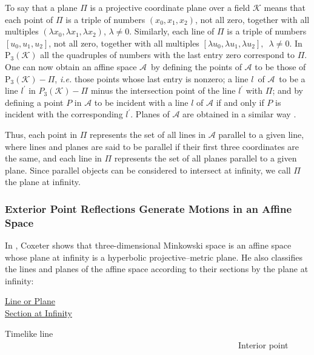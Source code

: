 \documentclass[a4paper,twoside,12pt]{article}
\begin{document}
     To say that a plane $\Pi$ is a projective coordinate plane over a field 
$\mathcal{K}$ means that each point of $\Pi$ is a triple of numbers 
$(x_{0},x_{1},x_{2})$, not all zero, together with all multiples 
$(\lambda x_{0},\lambda x_{1},\lambda x_{2})$, $\lambda \neq 0$. Similarly,
each line of $\Pi$ is a triple of numbers $[u_{0},u_{1},u_{2}]$, not all 
zero, together with all multiples 
$[\lambda u_{0},\lambda u_{1},\lambda u_{2}],$\ $\lambda \neq 0$. 
In P$_{3}(\mathcal{K})$ all the quadruples of
numbers with the last entry zero correspond to $\Pi$. One can now obtain an
affine space $\mathcal{A}$\ by defining the points of $\mathcal{A}$ to be
those of P$_{3}(\mathcal{K})-\Pi $, {\it i.e.} those points whose last entry
is nonzero; a line $l$\ of $\mathcal{A}$\ to be a line $l^{\prime }$ in 
$P_{3}(\mathcal{K})-\Pi $ minus the intersection point of the line 
$l^{\prime}$ with $\Pi$; and by defining a point $P$ in $\mathcal{A}$ to be
incident with a line $l$ of $\mathcal{A}$ if and only if $P$ is
incident with the corresponding $l^{\prime}$. Planes of $\mathcal{A}$ are
obtained in a similar way \cite{Cox4}.

   Thus, each point in $\Pi$ represents the set of all lines in $\mathcal{A}$
parallel to a given line, where lines and planes are said to be parallel
if their first three coordinates are the same, and each line in $\Pi$
represents the set of all planes parallel to a given plane. Since parallel
objects can be considered to intersect at infinity, we call $\Pi$ the
plane at infinity.

\subsubsection{Exterior Point Reflections Generate Motions in an Affine Space}

      In \cite{Cox1}, Coxeter
shows that three-dimensional Minkowski space is an affine space whose plane
at infinity is a hyperbolic projective--metric plane. He also classifies the
lines and planes of the affine space according to their sections by the
plane at infinity:

\medskip

\underline{Line or Plane}\ \ \ \ \ \ \ \ \ \ \ \ \ \ \ \ \ \ \ \ \ \ \ \ \ \
\ \ \ \ \ \ \ \ \ \ \ \ \ \ \ \ \ \ \ \ \ \ \ \ \ \ \ \ \ \ \underline{%
Section at Infinity}

Timelike line \ \ \ \ \ \ \ \ \ \ \ \ \ \ \ \ \ \ \ \ \ \ \ \ \ \ \ \ \ \ \
\ \ \ \ \ \ \ \ \ \ \ \ \ \ \ \ \ \ \ \ \ \ \ \ Interior point
\end{document}
